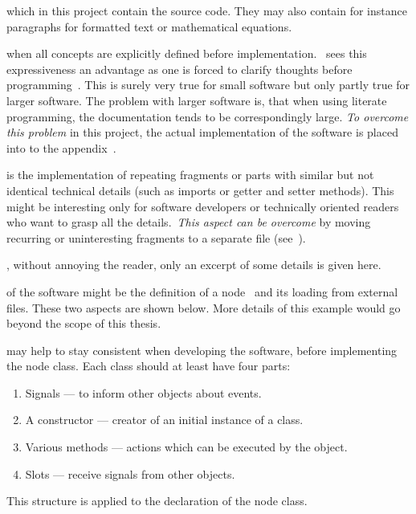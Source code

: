 \documentclass[%
    a4paper,    %
    justified,  %
    nobib,      %
    openany     %
]{tufte-book}
\begin{document}
 which in this project contain the
source code. They may also contain for instance paragraphs for formatted text or
mathematical equations.

 when all concepts are
explicitly defined before implementation.~\citeauthor{knuth-lp-1984} sees this
expressiveness an advantage as one is forced to clarify thoughts before
programming~\cite[p. 13]{knuth-lp-1984}. This is surely very true for small
software but only partly true for larger software. The problem with larger
software is, that when using literate programming, the documentation tends to be
correspondingly large. \emph{To overcome this problem} in this project, the
actual implementation of the software is placed into to the
appendix~.

 is the implementation of repeating
fragments or parts with similar but not identical technical details (such as imports
or getter and setter methods). This might be interesting only for
software developers or technically oriented readers who want to grasp all the
details.~\emph{This aspect can
be overcome} by moving recurring or uninteresting fragments to a separate
file (see~).

,
without annoying the reader, only an excerpt of some details is given here.

 of the software might
be the definition of a node~ and its loading from external files. These two aspects are shown
below. More details of this example would go beyond the scope of this thesis.

 may help to stay
consistent when developing the software, before implementing the node class.
Each class should at least have four parts:
\begin{enumerate}
  \item Signals --- to inform other objects about events.
  \item A constructor --- creator of an initial instance of a class.
  \item Various methods --- actions which can be executed by the object.
  \item Slots --- receive signals from other objects.
\end{enumerate}
This structure is applied to the declaration of the node class.
\end{document}

